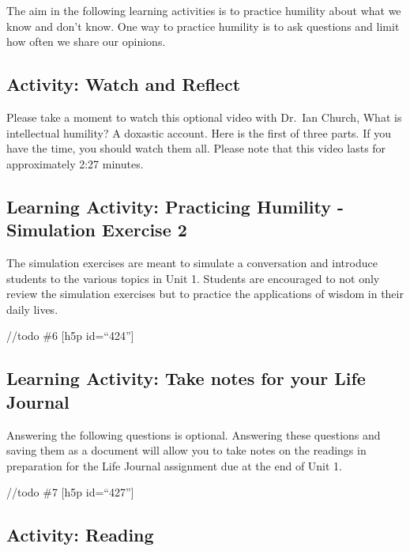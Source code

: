 \documentclass[
]{book}
\begin{document}
The aim in the following learning activities is to practice humility about what we know and don't know. One way to practice humility is to ask questions and limit how often we share our opinions.

\hypertarget{activity-watch-and-reflect-2}{%
\subsection*{Activity: Watch and Reflect}\label{activity-watch-and-reflect-2}}

\begin{reflect}
Please take a moment to watch this optional video with Dr.~Ian Church, What is intellectual humility? A doxastic account. Here is the first of three parts. If you have the time, you should watch them all. Please note that this video lasts for approximately 2:27 minutes.
\end{reflect}

\hypertarget{learning-activity-practicing-humility---simulation-exercise-2}{%
\subsection{Learning Activity: Practicing Humility - Simulation Exercise 2}\label{learning-activity-practicing-humility---simulation-exercise-2}}

The simulation exercises are meant to simulate a conversation and introduce students to the various topics in Unit 1. Students are encouraged to not only review the simulation exercises but to practice the applications of wisdom in their daily lives.

//todo \#6
{[}h5p id=``424''{]}

\hypertarget{learning-activity-take-notes-for-your-life-journal-2}{%
\subsection{Learning Activity: Take notes for your Life Journal}\label{learning-activity-take-notes-for-your-life-journal-2}}

Answering the following questions is optional. Answering these questions and saving them as a document will allow you to take notes on the readings in preparation for the Life Journal assignment due at the end of Unit 1.

//todo \#7
{[}h5p id=``427''{]}

\hypertarget{activity-reading-2}{%
\subsection*{Activity: Reading}\label{activity-reading-2}}
\end{document}
